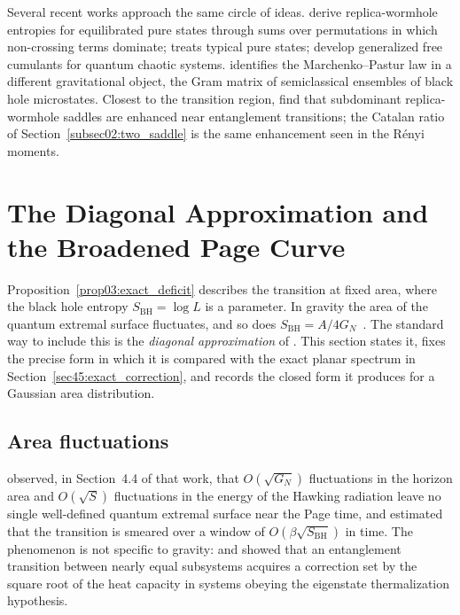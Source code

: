 \documentclass[11pt,letterpaper]{article}
\theoremstyle{plain}
\theoremstyle{definition}
\theoremstyle{remark}
\begin{document}
Several recent works approach the same circle of ideas. \citet{liuvardhan2021} derive replica-wormhole entropies for equilibrated pure states through sums over permutations in which non-crossing terms dominate; \citet{urbach2021} treats typical pure states; \citet{jindalhosur2024} develop generalized free cumulants for quantum chaotic systems. \citet{muck2024} identifies the Marchenko--Pastur law in a different gravitational object, the Gram matrix of semiclassical ensembles of black hole microstates. Closest to the transition region, \citet{kudlerflamrath2022} find that subdominant replica-wormhole saddles are enhanced near entanglement transitions; the Catalan ratio of Section~\ref{subsec02:two_saddle} is the same enhancement seen in the R\'enyi moments.

\section{The Diagonal Approximation and the Broadened Page Curve}
\label{sec04:area_fluctuations}

Proposition~\ref{prop03:exact_deficit} describes the transition at fixed area, where the black hole entropy $S_{\mathrm{BH}} = \log L$ is a parameter. In gravity the area of the quantum extremal surface fluctuates, and so does $S_{\mathrm{BH}} = A/4G_N$~\citep{bekenstein1973}. The standard way to include this is the \emph{diagonal approximation} of \citet{marolfwangwang2020}. This section states it, fixes the precise form in which it is compared with the exact planar spectrum in Section~\ref{sec45:exact_correction}, and records the closed form it produces for a Gaussian area distribution.

\subsection{Area fluctuations}
\label{subsec04:fluctuation_mechanism}

\citet{penington2020} observed, in Section~4.4 of that work, that $O(\sqrt{G_N})$ fluctuations in the horizon area and $O(\sqrt{S})$ fluctuations in the energy of the Hawking radiation leave no single well-defined quantum extremal surface near the Page time, and estimated that the transition is smeared over a window of $O(\beta\sqrt{S_{\mathrm{BH}}})$ in time. The phenomenon is not specific to gravity: \citet{vidmarrigol2017} and \citet{murthysrednicki2019} showed that an entanglement transition between nearly equal subsystems acquires a correction set by the square root of the heat capacity in systems obeying the eigenstate thermalization hypothesis.
\end{document}

